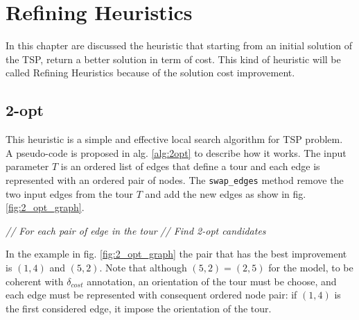 \chapter{Refining Heuristics}
\label{chapter:refininf}
In this chapter are discussed the heuristic that starting from an initial solution of the TSP, return a better solution in term of cost. This kind of heuristic will be called Refining Heuristics because of the solution cost improvement. 

\section{2-opt} \label{sec:best_2_opt}

This heuristic is a simple and effective local search algorithm for TSP problem.\\
A pseudo-code is proposed in alg. \ref{alg:2opt} to describe how it works. The input parameter $ T $ is an ordered list of edges that define a tour and each edge is represented with an ordered pair of nodes. The \texttt{swap\_edges} method remove the two input edges from the tour $ T $ and add the new edges as show in fig. \ref{fig:2_opt_graph}.

\begin{algorithm}
	\caption{}\label{alg:2opt}
	\begin{algorithmic}[1]
			 \textit{ // For each pair of edge in the tour}
				\EndIf
				 \textit{ // Find 2-opt candidates}
				\EndIf
			\EndFor
		\EndFor
	\EndProcedure
	\end{algorithmic}
\end{algorithm}

In the example in fig. \ref{fig:2_opt_graph} the pair that has the best improvement is $ (1,4) $ and $ (5,2) $. Note that although $ (5,2) = (2,5) $ for the model, to be coherent with $ \delta_{cost} $ annotation, an orientation of the tour must be choose, and each edge must be represented with consequent ordered node pair: if $ (1,4) $ is the first considered edge, it impose the orientation of the tour.

